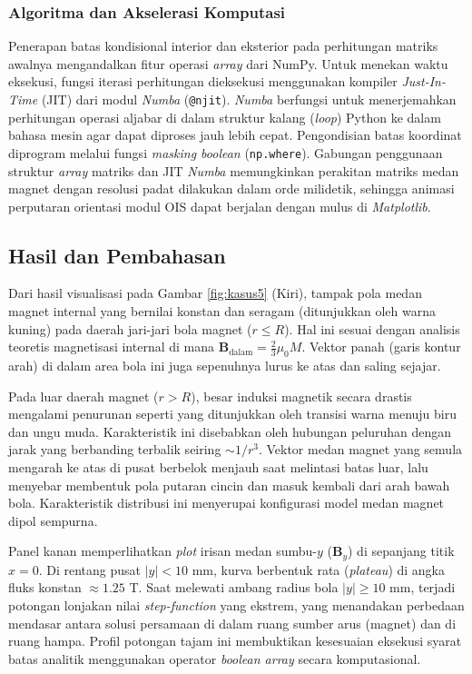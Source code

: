 \documentclass[11pt,a4paper]{article}
\begin{document}
\subsubsection{Algoritma dan Akselerasi Komputasi}
Penerapan batas kondisional interior dan eksterior pada perhitungan matriks awalnya mengandalkan fitur operasi \textit{array} dari NumPy. Untuk menekan waktu eksekusi, fungsi iterasi perhitungan dieksekusi menggunakan kompiler \textit{Just-In-Time} (JIT) dari modul \textit{Numba} (\texttt{@njit}). \textit{Numba} berfungsi untuk menerjemahkan perhitungan operasi aljabar di dalam struktur kalang (\textit{loop}) Python ke dalam bahasa mesin agar dapat diproses jauh lebih cepat. Pengondisian batas koordinat diprogram melalui fungsi \textit{masking boolean} (\texttt{np.where}). Gabungan penggunaan struktur \textit{array} matriks dan JIT \textit{Numba} memungkinkan perakitan matriks medan magnet dengan resolusi padat dilakukan dalam orde milidetik, sehingga animasi perputaran orientasi modul OIS dapat berjalan dengan mulus di \textit{Matplotlib}.

\subsection{Hasil dan Pembahasan}

Dari hasil visualisasi pada Gambar \ref{fig:kasus5} (Kiri), tampak pola medan magnet internal yang bernilai konstan dan seragam (ditunjukkan oleh warna kuning) pada daerah jari-jari bola magnet ($r \le R$). Hal ini sesuai dengan analisis teoretis magnetisasi internal di mana $\mathbf{B}_{\mathrm{dalam}} = \frac{2}{3}\mu_0 M$. Vektor panah (garis kontur arah) di dalam area bola ini juga sepenuhnya lurus ke atas dan saling sejajar.

Pada luar daerah magnet ($r > R$), besar induksi magnetik secara drastis mengalami penurunan seperti yang ditunjukkan oleh transisi warna menuju biru dan ungu muda. Karakteristik ini disebabkan oleh hubungan peluruhan dengan jarak yang berbanding terbalik seiring $\sim 1/r^3$. Vektor medan magnet yang semula mengarah ke atas di pusat berbelok menjauh saat melintasi batas luar, lalu menyebar membentuk pola putaran cincin dan masuk kembali dari arah bawah bola. Karakteristik distribusi ini menyerupai konfigurasi model medan magnet dipol sempurna.

Panel kanan memperlihatkan \textit{plot} irisan medan sumbu-$y$ ($\mathbf{B}_y$) di sepanjang titik $x=0$. Di rentang pusat $|y| < 10$ mm, kurva berbentuk rata (\textit{plateau}) di angka fluks konstan $\approx 1.25$ T. Saat melewati ambang radius bola $|y| \ge 10$ mm, terjadi potongan lonjakan nilai \textit{step-function} yang ekstrem, yang menandakan perbedaan mendasar antara solusi persamaan di dalam ruang sumber arus (magnet) dan di ruang hampa. Profil potongan tajam ini membuktikan kesesuaian eksekusi syarat batas analitik menggunakan operator \textit{boolean array} secara komputasional.
\end{document}
